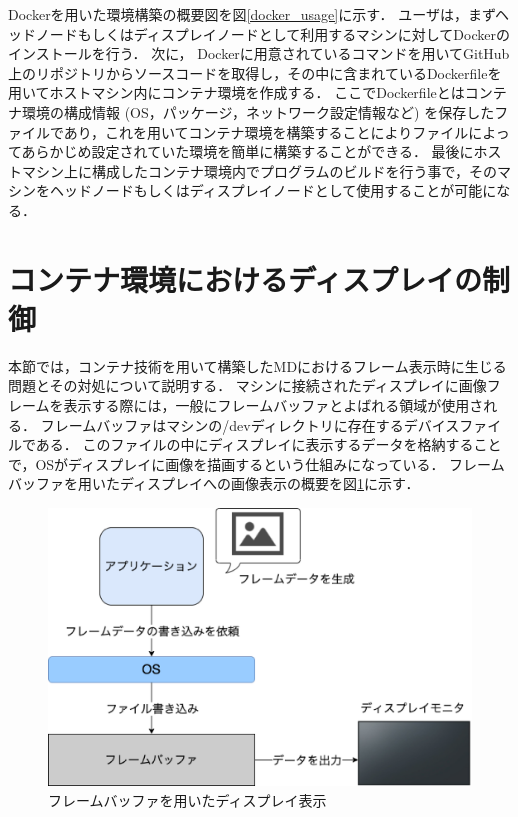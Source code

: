 Dockerを用いた環境構築の概要図を図\ref{docker_usage}に示す．
ユーザは，まずヘッドノードもしくはディスプレイノードとして利用するマシンに対してDockerのインストールを行う．
次に， Dockerに用意されているコマンドを用いてGitHub \cite{github}上のリポジトリからソースコードを取得し，その中に含まれているDockerfileを用いてホストマシン内にコンテナ環境を作成する．
ここでDockerfileとはコンテナ環境の構成情報 (OS，パッケージ，ネットワーク設定情報など) を保存したファイルであり，これを用いてコンテナ環境を構築することによりファイルによってあらかじめ設定されていた環境を簡単に構築することができる．
最後にホストマシン上に構成したコンテナ環境内でプログラムのビルドを行う事で，そのマシンをヘッドノードもしくはディスプレイノードとして使用することが可能になる．

\section{コンテナ環境におけるディスプレイの制御}
本節では，コンテナ技術を用いて構築したMDにおけるフレーム表示時に生じる問題とその対処について説明する．
マシンに接続されたディスプレイに画像フレームを表示する際には，一般にフレームバッファとよばれる領域が使用される．
フレームバッファはマシンの/devディレクトリに存在するデバイスファイルである．
このファイルの中にディスプレイに表示するデータを格納することで，OSがディスプレイに画像を描画するという仕組みになっている．
フレームバッファを用いたディスプレイへの画像表示の概要を図\ref{framebuffer}に示す．

\begin{figure}[H]
    \hspace*{\fill}
    \includegraphics[width=\linewidth]{./fig/chap3/framebuffer.eps}
    \hspace*{\fill}
    \caption{フレームバッファを用いたディスプレイ表示}
    \label{framebuffer}
\end{figure}

